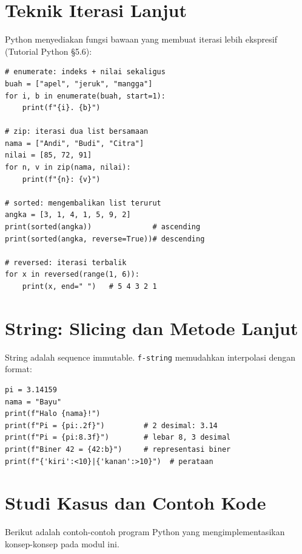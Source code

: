 \documentclass[../main.tex]{subfiles}
\begin{document}
\section{Teknik Iterasi Lanjut}

Python menyediakan fungsi bawaan yang membuat iterasi lebih ekspresif (Tutorial Python §5.6):

\begin{lstlisting}[caption=enumerate zip dan items]
# enumerate: indeks + nilai sekaligus
buah = ["apel", "jeruk", "mangga"]
for i, b in enumerate(buah, start=1):
    print(f"{i}. {b}")

# zip: iterasi dua list bersamaan
nama = ["Andi", "Budi", "Citra"]
nilai = [85, 72, 91]
for n, v in zip(nama, nilai):
    print(f"{n}: {v}")

# sorted: mengembalikan list terurut
angka = [3, 1, 4, 1, 5, 9, 2]
print(sorted(angka))              # ascending
print(sorted(angka, reverse=True))# descending

# reversed: iterasi terbalik
for x in reversed(range(1, 6)):
    print(x, end=" ")   # 5 4 3 2 1
\end{lstlisting}

\section{String: Slicing dan Metode Lanjut}

String adalah sequence immutable. \texttt{f-string} memudahkan interpolasi dengan format:

\begin{lstlisting}[caption=f-string dengan format specification]
pi = 3.14159
nama = "Bayu"
print(f"Halo {nama}!")
print(f"Pi = {pi:.2f}")         # 2 desimal: 3.14
print(f"Pi = {pi:8.3f}")        # lebar 8, 3 desimal
print(f"Biner 42 = {42:b}")     # representasi biner
print(f"{'kiri':<10}|{'kanan':>10}")  # perataan
\end{lstlisting}

\section{Studi Kasus dan Contoh Kode}

Berikut adalah contoh-contoh program Python yang mengimplementasikan konsep-konsep pada modul ini.
\end{document}
